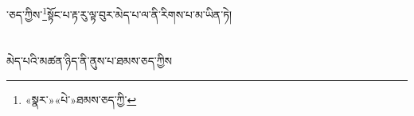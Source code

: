 ་ཅད་ཀྱིས་\footnote{«སྣར་»«པེ་»ཐམས་ཅད་ཀྱི་}སྟོང་པ་རྟ་རུ་ལྟ་བུར་མེད་པ་ལ་ནི་རིགས་པ་མ་ཡིན་ཏེ།\chapter{ }མེད་པའི་མཚན་ཉིད་ནི་ནུས་པ་ཐམས་ཅད་ཀྱིས